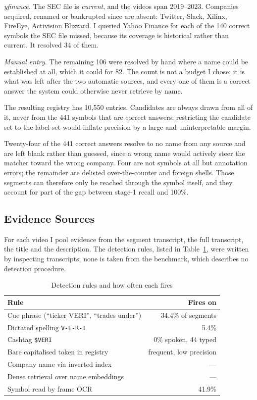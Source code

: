 \documentclass[conference]{IEEEtran}
\begin{document}
\emph{yfinance.} The SEC file is \emph{current}, and the videos span
2019--2023. Companies acquired, renamed or bankrupted since are absent: Twitter,
Slack, Xilinx, FireEye, Activision Blizzard. I queried Yahoo Finance for each of the
140 correct symbols the SEC file missed, because its coverage is historical
rather than current. It resolved 34 of them.

\emph{Manual entry.} The remaining 106 were resolved by hand where a name
could be established at all, which it could for 82. The count is not a budget I
chose; it is what was left after the two automatic sources, and every one of
them is a correct answer the system could otherwise never retrieve by name.

The resulting registry has 10{,}550 entries. Candidates are always drawn from
all of it, never from the 441 symbols that are correct answers; restricting the
candidate set to the label set would inflate precision by a large and
uninterpretable margin.

Twenty-four of the 441 correct answers resolve to no name from any source and
are left blank rather than guessed, since a wrong name would actively steer the
matcher toward the wrong company. Four are not symbols at all but annotation
errors; the remainder are delisted over-the-counter and foreign shells. Those
segments can therefore only be reached through the symbol itself, and they
account for part of the gap between stage-1 recall and 100\%.

\subsection{Evidence Sources}

For each video I pool evidence from the segment transcript, the full transcript,
the title and the description. The detection rules, listed in Table~\ref{tab:rules}, were written by
inspecting transcripts; none is taken from the benchmark, which describes no
detection procedure.

\begin{table}[htbp]
\caption{Detection rules and how often each fires}
\label{tab:rules}
\centering
\begin{tabular}{lr}
\toprule
Rule & Fires on \\
\midrule
Cue phrase (``ticker VERI'', ``trades under'') & 34.4\% of segments \\
Dictated spelling \texttt{V-E-R-I} & 5.4\% \\
Cashtag \texttt{\$VERI} & 0\% spoken, 44 typed \\
Bare capitalised token in registry & frequent, low precision \\
Company name via inverted index & --- \\
Dense retrieval over name embeddings & --- \\
Symbol read by frame OCR & 41.9\% \\
\bottomrule
\end{tabular}
\end{table}
\end{document}
